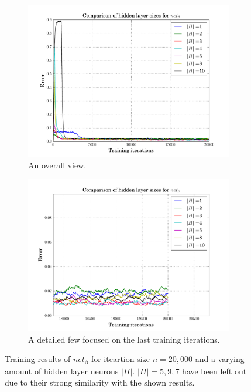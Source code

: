 \documentclass[10pt,a4paper,DIV=11]{scrreprt}
\begin{document}
\begin{figure}[H]
\centering
\begin{subfigure}{\textwidth}
  \centering
  \includegraphics[width=0.8\linewidth]{files/supervised/ha.pdf}
  \caption{An overall view.}
  \label{fig:hao}
\end{subfigure}%
\newline
\begin{subfigure}{\textwidth}
  \centering
  \includegraphics[width=0.8\linewidth]{files/supervised/haend.pdf}
  \caption{A detailed few focused on the last training iterations.}
  \label{fig:haend}
\end{subfigure}
\newline
\caption{Training results of $net_\beta$ for iteartion size $n = 20,000$ and a 
         varying amount of hidden layer neurons $|H|$. $|H| = 5,9,7$ have 
         been left out due to their strong similarity with the shown results.}
\label{fig:ha}
\end{figure}
\end{document}
